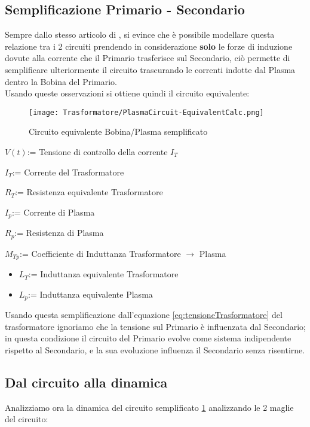 \subsection{Semplificazione Primario - Secondario}
Sempre dallo stesso articolo di \cite{TokamakCircuit}, si evince che è possibile modellare questa relazione tra i 2 circuiti prendendo in considerazione \textbf{solo} le forze di induzione dovute alla corrente che il Primario trasferisce sul Secondario, ciò permette di semplificare ulteriormente il circuito trascurando le correnti indotte dal Plasma dentro la Bobina del Primario.\\
Usando queste osservazioni si ottiene quindi il circuito equivalente:
\begin{figure}[H]	\label{fig:PlasmaSemplificato}
	\centering
	\caption[Circuito Semplificato Bobina/Plasma]{Circuito equivalente Bobina/Plasma semplificato}
	\texttt{[image: Trasformatore/PlasmaCircuit-EquivalentCalc.png]}
\end{figure}

\begin{leg}
	\item $V(t)$\tab:= Tensione di controllo della corrente $I_T$
	\item $I_T$\tab:= Corrente del Trasformatore
	\item $R_T$\tab:= Resistenza equivalente Trasformatore
	\item $I_p$\tab:= Corrente di Plasma
	\item $R_p$\tab:= Resistenza di Plasma
	\item $M_{Tp}$\tab:= Coefficiente di Induttanza Trasformatore $\rightarrow$ Plasma
	\begin{itemize} [topsep=-1mm,itemsep=0mm,label=$ \circ $]
		\item $L_T$\tab:= Induttanza equivalente Trasformatore
		\item $L_p$\tab:= Induttanza equivalente Plasma
	\end{itemize}
\end{leg}
\noindent
Usando questa semplificazione dall'equazione \ref{eq:tensioneTrasformatore} del trasformatore ignoriamo che la tensione sul Primario è influenzata dal Secondario; in questa condizione il circuito del Primario evolve come sistema indipendente rispetto al Secondario, e la sua evoluzione influenza il Secondario senza risentirne.

\newpage
\subsection{Dal circuito alla dinamica}\label{subsec:dinamicaCircuito}
Analizziamo ora la dinamica del circuito semplificato \ref{fig:PlasmaSemplificato} analizzando le 2 maglie del circuito:
